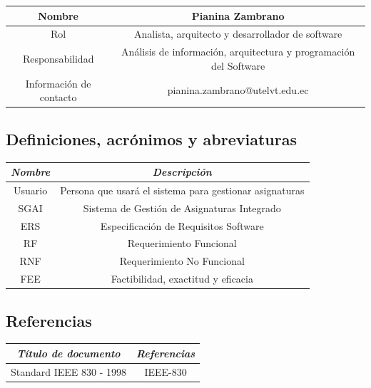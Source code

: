 \documentclass[11pt]{article}
\begin{document}
\begin{tabular}{|c|c|}

\hline
Nombre & Pianina Zambrano  \\
\hline
Rol & Analista, arquitecto y desarrollador de software \\
\hline
Responsabilidad & Análisis de información, arquitectura y programación del Software  \\
\hline
Información de contacto & pianina.zambrano@utelvt.edu.ec \\
\hline

\end{tabular}
\subsection{\textbf{Definiciones, acrónimos y abreviaturas}}

\vspace{10pt}

\begin{tabular}{|c|c|}

\hline
\textit{Nombre} & \textit{Descripción}  \\
\hline
Usuario & Persona que usará el sistema para gestionar asignaturas \\
\hline
SGAI & Sistema de Gestión de Asignaturas Integrado \\
\hline
ERS & Especificación de Requisitos Software \\
\hline
RF & Requerimiento Funcional \\
\hline
RNF & Requerimiento No Funcional\\
\hline
FEE & Factibilidad, exactitud y eficacia \\
\hline

\end{tabular}

\subsection{\textbf{Referencias}}

\begin{tabular}{|c|c|}

\hline
\textit{Título de documento} & \textit{Referencias}  \\
\hline
Standard IEEE 830 - 1998 & IEEE-830 \\
\hline

\end{tabular}


\newpage
\end{document}
